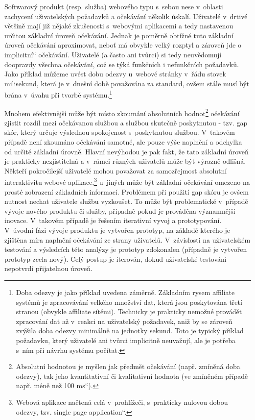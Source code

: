 \documentclass[12pt,twoside,openany]{fithesis}
\begin{document}
Softwarový produkt (resp. služba) webového typu s~sebou nese v~oblasti 
zachycení uživatelských požadavků a očekávání několik úskalí. 
Uživatelé v~drtivé většině mají již nějaké zkušenosti s~webovými 
aplikacemi a tedy nastavenou určitou základní úroveň očekávání. Jednak 
je poměrně obtížné tuto základní úroveň očekávání aproximovat, 
neboť má obvykle velký rozptyl a zároveň jde o~\glqq 
implicitní\textquotedblleft{} očekávání. Uživatelé (a často ani 
tvůrci) si tedy neuvědomují doopravdy všechna očekávání, což se týká 
funkčních i nefunkčních požadavků. Jako příklad můžeme uvést dobu 
odezvy u~webové stránky v~řádu stovek milisekund, která je v~dnešní 
době považována za standard, ovšem stále musí být brána v~úvahu při 
tvorbě systému.\footnote{
    Doba odezvy je jako příklad uvedena záměrně. Základním rysem 
affiliate systémů je zpracovávání velkého množství dat, která jsou 
poskytována třetí stranou (obvykle affiliate sítěmi). Technicky je 
prakticky nemožné provádět zpracování dat až v~reakci na uživatelský 
požadavek, aniž by se zároveň zvýšila doba odezvy minimálně na jednotky 
sekund. Toto je typický příklad požadavku, který uživatelé ani tvůrci 
implicitně neuvažují, ale je potřeba s~ním při návrhu systému počítat.}

Mnohem efektivnější může být místo zkoumání absolutních 
hodnot\footnote{
    Absolutní hodnotou je myšlen jak předmět očekávání (např. 
zmíněná doba odezvy), tak jeho kvantitativní či kvalitativní hodnota (ve 
zmíněném případě např. \glqq méně než 100 ms\textquotedblleft{}).}
očekávání zjistit 
rozdíl mezi očekávanou službou a službou skutečně poskytnutou - tzv. gap 
skór, který určuje výslednou spokojenost s~poskytnutou službou. 
\cite{spokojenost-lukasova}{} V~takovém případě není zkoumáno 
očekávání samotné, ale pouze výše naplnění a odchylka od určité 
základní úrovně. Hlavní nevýhodou je pak fakt, že tato základní 
úroveň je prakticky nezjistitelná a v~rámci různých uživatelů může 
být výrazně odlišná. Někteří pokročilejší uživatelé mohou 
považovat za samozřejmost absolutní interaktivitu webové 
aplikace,\footnote{
    Webová aplikace načtená celá v~prohlížeči, s~prakticky nulovou dobou 
odezvy, tzv. \glqq single page application\textquotedblleft{}.}
u~jiných může být 
základní očekávání omezeno na prosté zobrazení základních informací. 
Problémem při použití gap skóru je ovšem nutnost nechat uživatele 
službu vyzkoušet. To může být problematické v~případě vývoje nového 
produktu či služby, případně pokud je prováděna významnější inovace. 
V~takovém případě je řešením iterativní vyvoj a prototypování. 
V~úvodní fázi vývoje produktu je vytvořen prototyp, na základě kterého 
je zjištěna míra naplnění očekávání ze strany uživatelů. 
V~závislosti na uživatelském testování a výsledcích této analýzy je 
prototyp zdokonalen (případně je vytvořen prototyp zcela nový). Celý 
postup je iterován, dokud uživatelské testování nepotvrdí přijatelnou 
úroveň.
\end{document}
